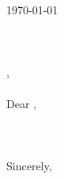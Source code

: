 \documentclass{article}
\begin{document}
    
    
    \header
    
    \bigskip\large
    
    \begin{singlespace}
        \today \\\\
        \ifthenelse{\NOT\equal{\recipientfirstname\recipientlastname\recipienttitle}{\empty}}{
            \recipientfirstname\ \recipientlastname \\
            \recipienttitle \\
        }{}
        \company \\
        \companyaddress \\
        \companycity, \companystate\ \companyzipcode \\\\
        Dear \recipientname, \\\\
         \\\\
        Sincerely,\\
        \name
    \end{singlespace}
\end{document}
